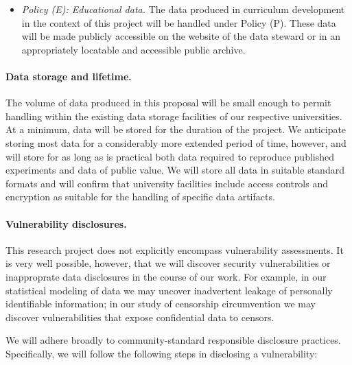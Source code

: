 \begin{itemize}
\item {\em Policy (E): Educational data.} The data produced in curriculum
development in the context of this project will be handled under Policy (P).
These data will be made publicly accessible on the website of the data steward
or in an appropriately locatable and accessible public archive.  
\end{itemize}

\paragraph{Data storage and lifetime.} The volume of data produced in this
proposal will be small enough to permit handling within the existing data
storage facilities of our respective universities. At a minimum, data will be
stored for the duration of the project. We anticipate storing most data for a
considerably more extended period of time, however, and will store for as long
as is practical both data required to reproduce published experiments and data
of public value. We will store all data in suitable standard formats and will
confirm that university facilities include access controls and encryption as
suitable for the handling of specific data artifacts.

\paragraph{Vulnerability disclosures.} This research project does not explicitly
encompass vulnerability assessments. It is very well possible, however, that we
will discover security vulnerabilities or inapproprate data disclosures in the
course of our work. For example, in our statistical modeling of data we may
uncover inadvertent leakage of personally identifiable information; in our study
of censorship circumvention we may discover vulnerabilities that expose
confidential data to censors.

We will adhere broadly to community-standard responsible disclosure practices.
Specifically, we will follow the following steps in disclosing a vulnerability:

